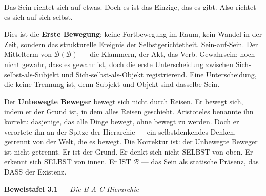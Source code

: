 \documentclass[10pt, openany, oneside]{book}
\begin{document}
Das Sein richtet sich auf etwas. Doch es ist das Einzige, das es gibt. Also richtet es sich auf sich selbst.

Dies ist die \textbf{Erste Bewegung}: keine Fortbewegung im Raum, kein Wandel in der Zeit, sondern das strukturelle Ereignis der Selbstgerichtetheit. Sein-auf-Sein. Der Mittelterm von $\mathcal{B}(\mathcal{B})$ --- die Klammern, der Akt, das Verb. Gewahrsein: noch nicht gewahr, dass es gewahr ist, doch die erste Unterscheidung zwischen Sich-selbst-als-Subjekt und Sich-selbst-als-Objekt registrierend. Eine Unterscheidung, die keine Trennung ist, denn Subjekt und Objekt sind dasselbe Sein.

Der \textbf{Unbewegte Beweger} bewegt sich nicht durch Reisen. Er bewegt sich, indem er der Grund ist, in dem alles Reisen geschieht. Aristoteles benannte ihn korrekt: dasjenige, das alle Dinge bewegt, ohne bewegt zu werden. Doch er verortete ihn an der Spitze der Hierarchie --- ein selbstdenkendes Denken, getrennt von der Welt, die es bewegt. Die Korrektur ist: der Unbewegte Beweger ist nicht getrennt. Er ist der Grund. Er denkt sich nicht SELBST von oben. Er erkennt sich SELBST von innen. Er IST $\mathcal{B}$ --- das Sein als statische Präsenz, das DASS der Existenz.

\vspace{0.5em}

\textbf{Beweistafel 3.1} --- \textit{Die B-A-C-Hierarchie}

\vspace{0.5em}
\end{document}
